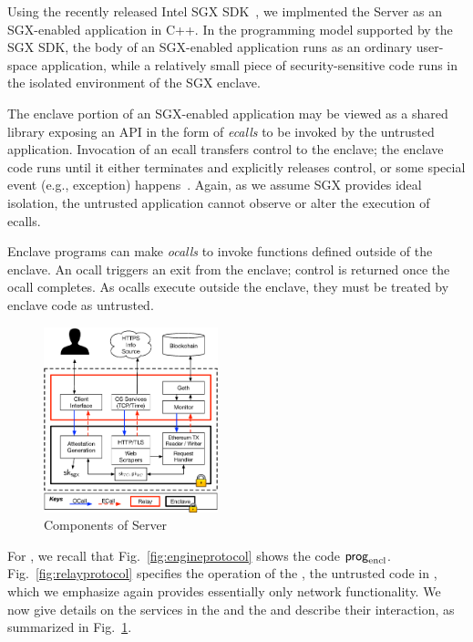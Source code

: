 

Using the recently released Intel SGX SDK~\cite{sgxsdk}, we implmented the \tc
Server as an SGX-enabled application in C++. In the programming model supported by
the SGX SDK, the body of an SGX-enabled application runs as an 
ordinary user-space application, while a relatively small piece of security-sensitive code runs in the isolated environment of the SGX enclave.

The enclave portion of an SGX-enabled application may be
viewed as a shared library exposing an API in the form of \emph{ecalls}
to be invoked by the untrusted application. Invocation of an ecall transfers control to the 
enclave; the enclave code runs until it either terminates and explicitly releases control, or some special event (e.g., exception) happens~\cite{sgxmanual}.
Again, as we assume SGX provides ideal isolation, the untrusted application cannot
observe or alter the execution of ecalls.

Enclave programs can make \emph{ocalls} to invoke functions defined outside of the enclave. An ocall triggers an exit from the enclave; control is returned once the ocall completes. As ocalls execute outside the enclave, they must be treated by enclave code as untrusted. 
\begin{figure}[h]
    \centering
    \includegraphics[width=0.45\textwidth]{figures/impl}
    \caption{Components of \tc Server}
    \label{fig:tcserver_impl}
\end{figure}

For \tc, we recall that Fig.~\ref{fig:engineprotocol} shows the \encname code ${\sf prog}_{\textrm{encl}}$. Fig.~\ref{fig:relayprotocol} specifies the operation of the \medname, the untrusted code in \tc, which we emphasize again provides essentially only network functionality. We now give details on the services in the \encname and the \medname and describe their interaction, as summarized in Fig.~\ref{fig:tcserver_impl}.

